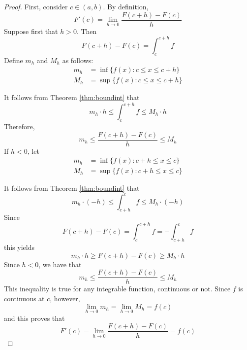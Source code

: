 \begin{proof}
    First, consider $c \in (a,b)$. By definition,\begin{equation*}
        F'(c) = \lim\limits_{h\rightarrow 0}\frac{F(c+h)-F(c)}{h}
    \end{equation*}
    Suppose first that $h > 0$. Then \begin{equation*}
        F(c+h) - F(c) = \int_c^{c+h}f
    \end{equation*}
    Define $m_h$ and $M_h$ as follows:\begin{align*}
        m_h &= \inf\{f(x):c\leq x \leq c+h\} \\
        M_h &= \sup\{f(x):c\leq x \leq c+h\}
    \end{align*}

    It follows from Theorem \ref{thm:boundint} that \begin{equation*}
        m_h\cdot h\leq \int_c^{c+h}f \leq M_h\cdot h
    \end{equation*}
    Therefore, \begin{equation*}
        m_h\leq \frac{F(c+h) - F(c)}{h} \leq M_h
    \end{equation*}
    If $h < 0$, let \begin{align*}
        m_h &= \inf\{f(x):c+h\leq x \leq c\} \\
        M_h &= \sup\{f(x):c+h\leq x \leq c\}
    \end{align*}

    It follows from Theorem \ref{thm:boundint} that \begin{equation*}
        m_h\cdot (-h)\leq \int_{c+h}^{c}f \leq M_h\cdot (-h)
    \end{equation*}
    Since \begin{equation*}
        F(c+h) - F(c) = \int_c^{c+h}f = -\int_{c+h}^cf
    \end{equation*}
    this yields \begin{equation*}
        m_h\cdot h\geq F(c+h) - F(c) \geq M_h\cdot h
    \end{equation*}
    Since $h < 0$, we have that \begin{equation*}
        m_h \leq \frac{F(c+h) - F(c)}{h} \leq M_h
    \end{equation*}
    This inequality is true for any integrable function, continuous or not. Since $f$ is continuous at $c$, however, \begin{equation*}
        \lim\limits_{h\rightarrow 0}m_h = \lim\limits_{h\rightarrow 0}M_h = f(c)
    \end{equation*}
    and this proves that \begin{equation*}
        F'(c) = \lim\limits_{h\rightarrow 0}\frac{F(c+h) - F(c)}{h} = f(c)
    \end{equation*}



\end{proof}
